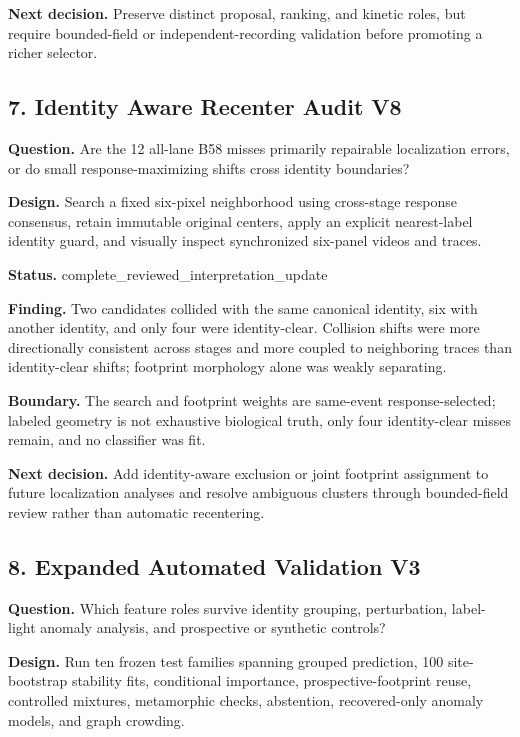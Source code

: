\textbf{Next decision.} Preserve distinct proposal, ranking, and kinetic roles, but require bounded-field or independent-recording validation before promoting a richer selector.

\subsection{7. Identity Aware Recenter Audit V8}

\textbf{Question.} Are the 12 all-lane B58 misses primarily repairable localization errors, or do small response-maximizing shifts cross identity boundaries?

\textbf{Design.} Search a fixed six-pixel neighborhood using cross-stage response consensus, retain immutable original centers, apply an explicit nearest-label identity guard, and visually inspect synchronized six-panel videos and traces.

\textbf{Status.} complete\_reviewed\_interpretation\_update

\textbf{Finding.} Two candidates collided with the same canonical identity, six with another identity, and only four were identity-clear. Collision shifts were more directionally consistent across stages and more coupled to neighboring traces than identity-clear shifts; footprint morphology alone was weakly separating.

\textbf{Boundary.} The search and footprint weights are same-event response-selected; labeled geometry is not exhaustive biological truth, only four identity-clear misses remain, and no classifier was fit.

\textbf{Next decision.} Add identity-aware exclusion or joint footprint assignment to future localization analyses and resolve ambiguous clusters through bounded-field review rather than automatic recentering.

\subsection{8. Expanded Automated Validation V3}

\textbf{Question.} Which feature roles survive identity grouping, perturbation, label-light anomaly analysis, and prospective or synthetic controls?

\textbf{Design.} Run ten frozen test families spanning grouped prediction, 100 site-bootstrap stability fits, conditional importance, prospective-footprint reuse, controlled mixtures, metamorphic checks, abstention, recovered-only anomaly models, and graph crowding.

